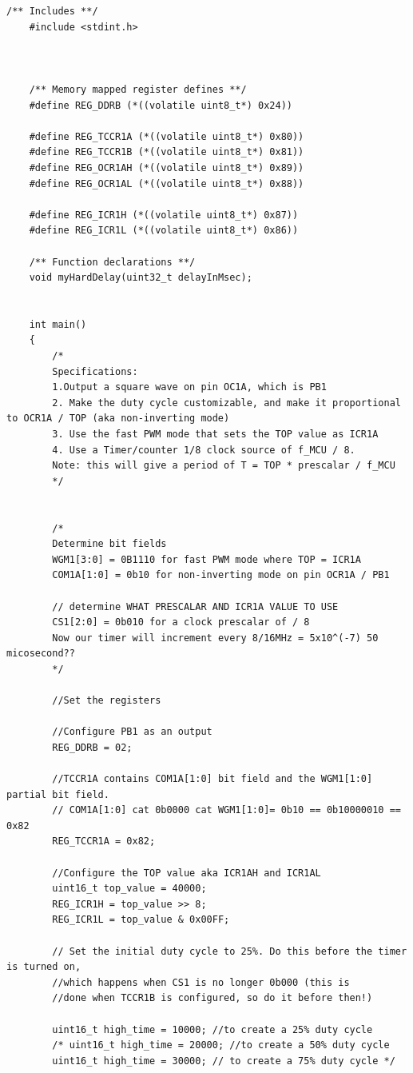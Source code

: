\documentclass[11pt,pdftex,portrait,letterpaper]{article}
\begin{document}
	\begin{lstlisting}[caption={Program 2}, label=l:programx]
	/** Includes **/
	#include <stdint.h>

	
	
	/** Memory mapped register defines **/
	#define REG_DDRB (*((volatile uint8_t*) 0x24))
	
	#define REG_TCCR1A (*((volatile uint8_t*) 0x80))
	#define REG_TCCR1B (*((volatile uint8_t*) 0x81))
	#define REG_OCR1AH (*((volatile uint8_t*) 0x89))
	#define REG_OCR1AL (*((volatile uint8_t*) 0x88))
	
	#define REG_ICR1H (*((volatile uint8_t*) 0x87))
	#define REG_ICR1L (*((volatile uint8_t*) 0x86))
	
	/** Function declarations **/
	void myHardDelay(uint32_t delayInMsec);
	
	
	int main()
	{
		/*
		Specifications:
		1.Output a square wave on pin OC1A, which is PB1
		2. Make the duty cycle customizable, and make it proportional to OCR1A / TOP (aka non-inverting mode)
		3. Use the fast PWM mode that sets the TOP value as ICR1A
		4. Use a Timer/counter 1/8 clock source of f_MCU / 8.
		Note: this will give a period of T = TOP * prescalar / f_MCU
		*/
		
		
		/*
		Determine bit fields
		WGM1[3:0] = 0B1110 for fast PWM mode where TOP = ICR1A 
		COM1A[1:0] = 0b10 for non-inverting mode on pin OCR1A / PB1
		
		// determine WHAT PRESCALAR AND ICR1A VALUE TO USE
		CS1[2:0] = 0b010 for a clock prescalar of / 8 
		Now our timer will increment every 8/16MHz = 5x10^(-7) 50 micosecond??
		*/
		
		//Set the registers
		
		//Configure PB1 as an output
		REG_DDRB = 02;
		
		//TCCR1A contains COM1A[1:0] bit field and the WGM1[1:0] partial bit field.
		// COM1A[1:0] cat 0b0000 cat WGM1[1:0]= 0b10 == 0b10000010 == 0x82
		REG_TCCR1A = 0x82;
		
		//Configure the TOP value aka ICR1AH and ICR1AL
		uint16_t top_value = 40000;
		REG_ICR1H = top_value >> 8;
		REG_ICR1L = top_value & 0x00FF;
		
		// Set the initial duty cycle to 25%. Do this before the timer is turned on,
		//which happens when CS1 is no longer 0b000 (this is
		//done when TCCR1B is configured, so do it before then!)
		
		uint16_t high_time = 10000; //to create a 25% duty cycle
		/* uint16_t high_time = 20000; //to create a 50% duty cycle
		uint16_t high_time = 30000; // to create a 75% duty cycle */
		

\end{lstlisting}
\end{document}
